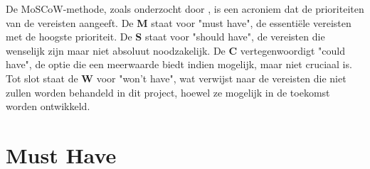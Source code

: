 De MoSCoW-methode, zoals onderzocht door \textcite{ACHIMUGU2014}, is een acroniem dat de prioriteiten van de vereisten aangeeft. De \textbf{M} staat voor "must have", de essentiële vereisten met de hoogste prioriteit. De \textbf{S} staat voor "should have", de vereisten die wenselijk zijn maar niet absoluut noodzakelijk. De \textbf{C} vertegenwoordigt "could have", de optie die een meerwaarde biedt indien mogelijk, maar niet cruciaal is. Tot slot staat de \textbf{W} voor "won’t have", wat verwijst naar de vereisten die niet zullen worden behandeld in dit project, hoewel ze mogelijk in de toekomst worden ontwikkeld.

    
\section{Must Have}

